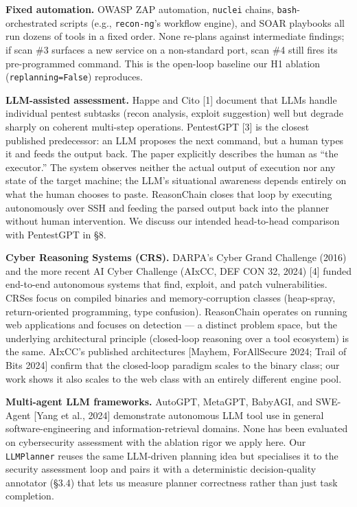 \documentclass[
]{article}
\begin{document}
\textbf{Fixed automation.} OWASP ZAP automation, \texttt{nuclei} chains,
\texttt{bash}-orchestrated scripts (e.g., \texttt{recon-ng}'s workflow
engine), and SOAR playbooks all run dozens of tools in a fixed order.
None re-plans against intermediate findings; if scan \#3 surfaces a new
service on a non-standard port, scan \#4 still fires its pre-programmed
command. This is the open-loop baseline our H1 ablation
(\texttt{replanning=False}) reproduces.

\textbf{LLM-assisted assessment.} Happe and Cito {[}1{]} document that
LLMs handle individual pentest subtasks (recon analysis, exploit
suggestion) well but degrade sharply on coherent multi-step operations.
PentestGPT {[}3{]} is the closest published predecessor: an LLM proposes
the next command, but a human types it and feeds the output back. The
paper explicitly describes the human as ``the executor.'' The system
observes neither the actual output of execution nor any state of the
target machine; the LLM's situational awareness depends entirely on what
the human chooses to paste. ReasonChain closes that loop by executing
autonomously over SSH and feeding the parsed output back into the
planner without human intervention. We discuss our intended head-to-head
comparison with PentestGPT in §8.

\textbf{Cyber Reasoning Systems (CRS).} DARPA's Cyber Grand Challenge
(2016) and the more recent AI Cyber Challenge (AIxCC, DEF CON 32, 2024)
{[}4{]} funded end-to-end autonomous systems that find, exploit, and
patch vulnerabilities. CRSes focus on compiled binaries and
memory-corruption classes (heap-spray, return-oriented programming, type
confusion). ReasonChain operates on running web applications and focuses
on detection --- a distinct problem space, but the underlying
architectural principle (closed-loop reasoning over a tool ecosystem) is
the same. AIxCC's published architectures {[}Mayhem, ForAllSecure 2024;
Trail of Bits 2024{]} confirm that the closed-loop paradigm scales to
the binary class; our work shows it also scales to the web class with an
entirely different engine pool.

\textbf{Multi-agent LLM frameworks.} AutoGPT, MetaGPT, BabyAGI, and
SWE-Agent {[}Yang et al., 2024{]} demonstrate autonomous LLM tool use in
general software-engineering and information-retrieval domains. None has
been evaluated on cybersecurity assessment with the ablation rigor we
apply here. Our \texttt{LLMPlanner} reuses the same LLM-driven planning
idea but specialises it to the security assessment loop and pairs it
with a deterministic decision-quality annotator (§3.4) that lets us
measure planner correctness rather than just task completion.
\end{document}
